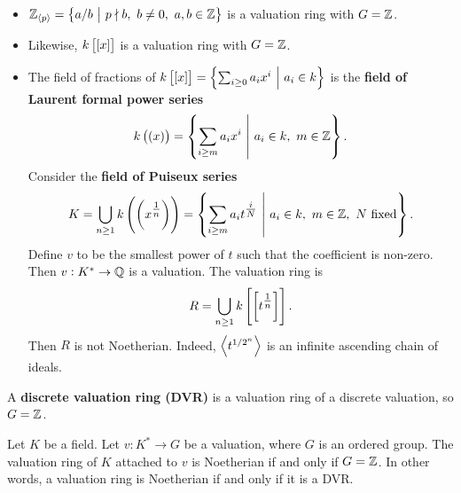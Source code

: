\begin{example*}
\hfill
\begin{itemize}
\item $ \ZZ_{\abr{p}} = \cbr{a / b \st p \nmid b, \ b \ne 0, \ a, b \in \ZZ} $ is a valuation ring with $ G = \mathbb{Z} $.
\item Likewise, $ k\sbr{\sbr{x}} $ is a valuation ring with $ G = \mathbb{Z} $.
\item The field of fractions of $ k\sbr{\sbr{x}} = \cbr{\sum_{i \ge 0} a_ix^i \st a_i \in k} $ is the \textbf{field of Laurent formal power series}
$$ k\br{\br{x}} = \cbr{\sum_{i \ge m} a_ix^i \st a_i \in k, \ m \in \ZZ}. $$
Consider the \textbf{field of Puiseux series}
$$ K = \bigcup_{n \ge 1} k\br{\br{x^{\tfrac{1}{n}}}} = \cbr{\sum_{i \ge m} a_it^{\tfrac{i}{N}} \st a_i \in k, \ m \in \ZZ, \ N \ \text{fixed}}. $$
Define $ v $ to be the smallest power of $ t $ such that the coefficient is non-zero. Then $ v : K^* \to \mathbb{Q} $ is a valuation. The valuation ring is
$$ R = \bigcup_{n \ge 1} k\sbr{\sbr{t^{\tfrac{1}{n}}}}. $$
Then $ R $ is not Noetherian. Indeed, $ \left\langle t^{1 / 2^n} \right\rangle $ is an infinite ascending chain of ideals.
\end{itemize}
\end{example*}


\begin{definition}
A \textbf{discrete valuation ring (DVR)} is a valuation ring of a discrete valuation, so $ G = \mathbb{Z} $.
\end{definition}

\begin{theorem}
\label{thm:15.4}
Let $ K $ be a field. Let $ v : K^* \to G $ be a valuation, where $ G $ is an ordered group. The valuation ring of $ K $ attached to $ v $ is Noetherian if and only if $ G = \mathbb{Z} $. In other words, a valuation ring is Noetherian if and only if it is a DVR.
\end{theorem}

